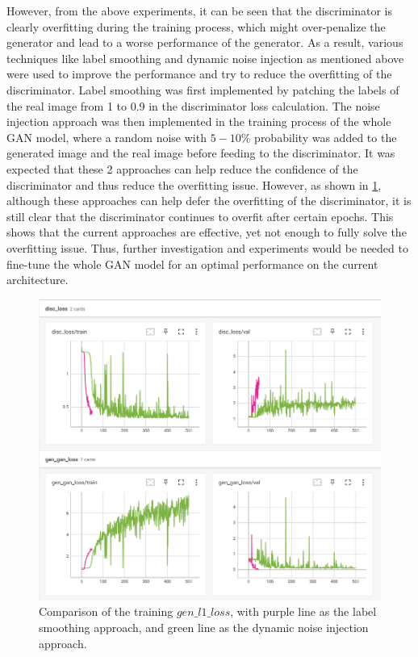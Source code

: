 \documentclass[10pt,twocolumn,letterpaper]{article}
\begin{document}
However, from the above experiments, it can be seen that the discriminator is clearly overfitting during the training process, which might over-penalize the generator and lead to a worse performance of the 
generator. As a result, various techniques like label smoothing and dynamic noise injection as mentioned above were used to improve the performance and try to reduce the overfitting of the discriminator. 
Label smoothing was first implemented by patching the labels of the real image from 1 to 0.9 in the discriminator loss calculation. The noise injection approach was then implemented in the training process of the 
whole GAN model, where a random noise with $5-10\%$ probability was added to the generated image and the real image before feeding to the discriminator. It was expected that these 2 approaches can help reduce the 
confidence of the discriminator and thus reduce the overfitting issue. However, as shown in \cref{fig:smooth_with_noise}, although these approaches can help defer the overfitting of the discriminator, it is still 
clear that the discriminator continues to overfit after certain epochs. This shows that the current approaches are effective, yet not enough to fully solve the overfitting issue. Thus, further investigation and 
experiments would be needed to fine-tune the whole GAN model for an optimal performance on the current architecture.

\begin{figure}[t]
    \centering
    \includegraphics[width=\linewidth]{figures/milestone/smooth_with_noise.png}
    \caption{Comparison of the training $gen\_l1\_loss$, with purple line as the label smoothing approach, and green line as the dynamic noise injection approach.}
    \label{fig:smooth_with_noise}
\end{figure}
\end{document}
